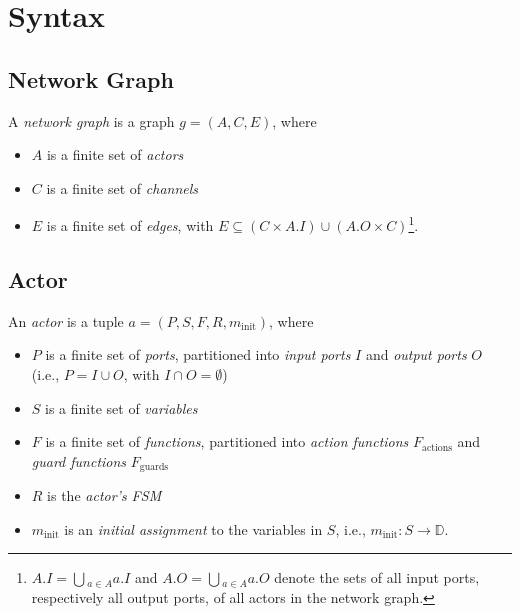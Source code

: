 
\chapter{Syntax}

%
%
\section{Network Graph}

\begin{definition}\label{def:network-graph}
A \emph{network graph} is a graph $g=(A,C,E)$, where
\begin{itemize}
\item $A$ is a finite set of \emph{actors}
\item $C$ is a finite set of \emph{channels}
\item $E$ is a finite set of \emph{edges}, with $E \subseteq (C \times A.I) \cup (A.O \times C)$\footnote{
 $A.I = \bigcup{}_{a \in A} a.I$ and $A.O = \bigcup{}_{a \in A} a.O$ denote the sets of all input ports, respectively all output ports, of all actors in the network graph.
}.
\end{itemize}
\end{definition}

%
%
\section{Actor}

\begin{definition}[Actor]\label{def:actor}
An \emph{actor} is a tuple $a=(P,S,F,R,m_\mathrm{init})$, where
\begin{itemize}
\item $P$ is a finite set of \emph{ports}, partitioned into \emph{input ports} $I$ and \emph{output ports} $O$ (i.e., $P=I\cup O$, with $I\cap O=\emptyset$) 
\item $S$ is a finite set of \emph{variables}
\item $F$ is a finite set of \emph{functions}, partitioned into \emph{action functions} $F_\mathrm{actions}$ and \emph{guard functions} $F_\mathrm{guards}$
\item $R$ is the \emph{actor's FSM}
\item $m_\mathrm{init}$ is an \emph{initial assignment} to the variables in $S$, i.e., $m_\mathrm{init} : S \rightarrow \mathbb{D}$.
\end{itemize}
\end{definition}

